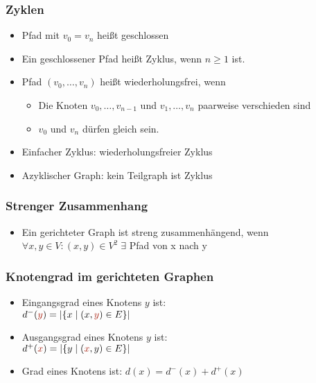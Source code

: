 \documentclass{article}
\newcommand{\important}[1]{\textcolor{importantColor}{#1}}
\newcommand{\set}[1]{\{#1\}}
\begin{document}
\subsubsection{Zyklen}
\begin{itemize}
    \item Pfad mit $v_0=v_n$ heißt \important{geschlossen}
    \item Ein geschlossener Pfad heißt \important{Zyklus}, wenn $n\geq 1$ ist.
    \item Pfad $(v_0,\dots, v_n)$ heißt \important{wiederholungsfrei}, wenn
    \begin{itemize}
        \item Die Knoten $v_0,\dots, v_{n-1}$ und $v_1,\dots, v_{n}$ paarweise verschieden sind
        \item $v_0$ und $v_n$ dürfen gleich sein.
    \end{itemize}
    \item \important{Einfacher Zyklus}: wiederholungsfreier Zyklus
    \item \important{Azyklischer Graph}: kein Teilgraph ist Zyklus
\end{itemize}

\subsubsection{Strenger Zusammenhang}
\begin{itemize}
    \item Ein gerichteter Graph ist \important{streng zusammenhängend}, wenn\\
    $\forall x,y \in V: (x,y)\in V^2 \;\exists$ Pfad von x nach y
\end{itemize}

\subsubsection{Knotengrad im gerichteten Graphen}
\begin{itemize}
    \item \important{Eingangsgrad} eines Knotens $y$ ist:\\
    $d^-(\important{y})=|\set{x\mid(x,\important{y})\in E}|$
    \item \important{Ausgangsgrad} eines Knotens $y$ ist:\\
    $d^+(\important{x})=|\set{y\mid(\important{x}, y)\in E}|$
    \item \important{Grad} eines Knotens ist:
    $d(x) = d^-(x) + d^+(x)$
\end{itemize}
\end{document}
